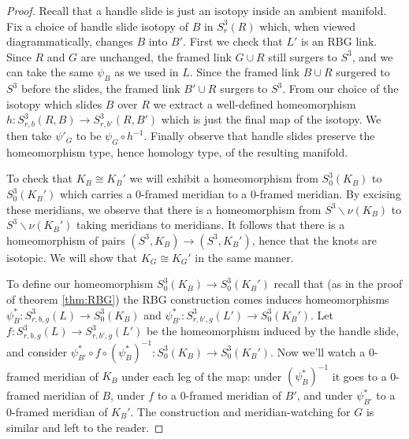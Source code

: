 \documentclass [11pt]{amsart}
\theoremstyle{remark}
\begin{document}
\begin{proof}
Recall that a handle slide is just an isotopy inside an ambient manifold. Fix a choice of handle slide isotopy of $B$ in $S^3_{r}(R)$ which, when viewed diagrammatically,  changes $B$ into $B'$.  First we check that $L'$ is an RBG link. Since $R$ and $G$ are unchanged, the framed link $G\cup R$ still surgers to $S^3$, and we can take the same $\psi_B$ as we used in $L$.  Since the framed link $B\cup R$  surgered to $S^3$ before the slides, the framed link $B'\cup R$ surgers to $S^3$. From our choice of the isotopy which slides $B$ over $R$ we extract a well-defined homeomorphism $h:S^3_{r,b}(R,B)\to S^3_{r,b'}(R,B')$ which is just the final map of the isotopy.  We then take $\psi'_G$ to be $\psi_G\circ h^{-1}$.  Finally observe that handle slides preserve the homeomorphism type, hence homology type, of the resulting manifold. 

To check that $K_B\cong K_B'$ we will exhibit a homeomorphism from $S^3_0(K_B)$ to $S^3_0(K_B')$ which carries a 0-framed meridian to a 0-framed meridian. By excising these meridians, we observe that there is a homeomorphism from $S^3\smallsetminus\nu(K_B)$ to $S^3\smallsetminus\nu(K_B')$ taking meridians to meridians. It follows that there is a homeomorphism of pairs $(S^3,K_B)\to (S^3,K_B')$, hence that the knots are isotopic. We will show that  $K_G\cong K_G'$  in the same manner. 

To define our homeomorphism $S^3_0(K_B)\to S^3_0(K_B')$ recall that (as in the proof of theorem \ref{thm:RBG}) the RBG construction comes induces homeomorphisms $\psi_B^*:S^3_{r,b,g}(L)\to S^3_0(K_B)$ and $\psi_{B'}^*:S^3_{r,b',g}(L')\to S^3_0(K_B')$. Let $f:S^3_{r,b,g}(L)\to S^3_{r,b',g}(L')$ be the homeomorphism induced by the handle slide, and consider $\psi_{B'}^*\circ f\circ (\psi_B^*)^{-1}:S^3_0(K_B)\to S^3_0(K_B')$. Now we'll watch a 0-framed meridian of $K_B$ under each leg of the map: under $(\psi_B^*)^{-1}$ it goes to a 0-framed meridian of $B$, under $f$ to a 0-framed meridian of $B'$, and under $\psi_{B'}^*$ to a 0-framed meridian of $K_B'$. The construction and meridian-watching for $G$ is similar and left to the reader.  
\end{proof}


\end{document}
